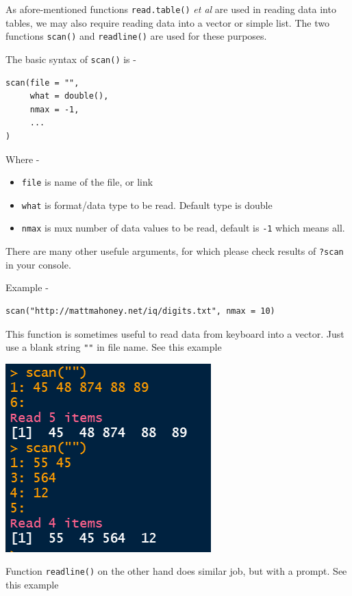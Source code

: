 \documentclass[
]{book}
\providecommand{\tightlist}{%
  \setlength{\itemsep}{0pt}\setlength{\parskip}{0pt}}
\begin{document}
As afore-mentioned functions \texttt{read.table()} \emph{et al} are used in reading data into tables, we may also require reading data into a vector or simple list. The two functions \texttt{scan()} and \texttt{readline()} are used for these purposes.

The basic syntax of \texttt{scan()} is -

\begin{verbatim}
scan(file = "",
     what = double(),
     nmax = -1,
     ...
)
\end{verbatim}

Where -

\begin{itemize}
\tightlist
\item
  \texttt{file} is name of the file, or link
\item
  \texttt{what} is format/data type to be read. Default type is double
\item
  \texttt{nmax} is mux number of data values to be read, default is \texttt{-1} which means all.
\end{itemize}

There are many other usefule arguments, for which please check results of \texttt{?scan} in your console.

Example -

\begin{verbatim}
scan("http://mattmahoney.net/iq/digits.txt", nmax = 10)
\end{verbatim}

This function is sometimes useful to read data from keyboard into a vector. Just use a blank string \texttt{""} in file name. See this example

\includegraphics{images/scan.png}

Function \texttt{readline()} on the other hand does similar job, but with a prompt. See this example
\end{document}
